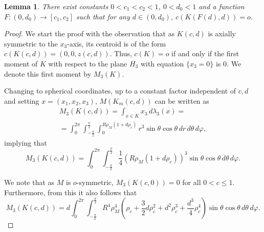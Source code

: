 \documentclass[twoside]{amsart}
\theoremstyle{plain}
\newtheorem{lemma}[theorem]{Lemma}
\theoremstyle{definition}
\numberwithin{equation}{section}
\begin{document}
\begin{lemma}\label{lem:centeringnormed}
There exist constants $0 < c_1 < c_2 < 1$, $0 < d_0 < 1$ and a function $F:(0,d_0) \to [c_1,c_2]$ such that for any $d \in (0,d_0)$,
$c(K(F(d),d))=o$.
\end{lemma}

\begin{proof}
We start the proof with the observation that as $K(c,d)$ is axially symmetric to the $x_3$-axis, its centroid is of the form $c(K(c,d))=(0,0,z(c,d))$. Thus, $c(K)=o$ if and only if the first moment of $K$ with respect to the plane $H_3$ with equation $\{ x_3 = 0 \}$ is $0$. We denote this first moment by $M_3(K)$.

Changing to spherical coordinates, up to a constant factor independent of $c,d$ and setting $x=(x_1,x_2,x_3)$, $M(K_m(c,d))$ can be written as
\begin{multline*}
M_3(K(c,d)) = \int_{x \in K} x_3  \, d \lambda_3(x) =\\
= 
\int_{0}^{2\pi}\int_{-\frac{\pi}{2}}^{\frac{\pi}{2}}\int_{0}^{R \rho_M(1 + d \rho_c)} r^3 \sin \theta \cos \theta \,dr\,d\theta\,d\varphi,
\end{multline*}
implying that
\begin{equation}\label{eq:firstmomentnormed}
M_3(K(c,d)) = \int_{0}^{2\pi}\int_{-\frac{\pi}{2}}^{\frac{\pi}{2}} \frac{1}{4} \left( R \rho_M(1 + d \rho_c) \right)^3 \sin \theta \cos \theta \,d\theta\,d\varphi .
\end{equation}

We note that as $M$ is $o$-symmetric, $M_3(K(c,0))=0$ for all $0 < c \leq 1$. Furthermore, from this it also follows that
\begin{equation}\label{eq:firstmomentnormedmod}
M_3(K(c,d)) = d \int_{0}^{2\pi}\int_{-\frac{\pi}{2}}^{\frac{\pi}{2}}  R^4 \rho_M^4 \left( \rho_c + \frac{3}{2} d \rho_c^2 + d^2 \rho_c^3 + \frac{d^3}{4} \rho_c^4\right) \sin \theta \cos \theta \,d\theta\,d\varphi .
\end{equation}


\end{proof}
\end{document}
